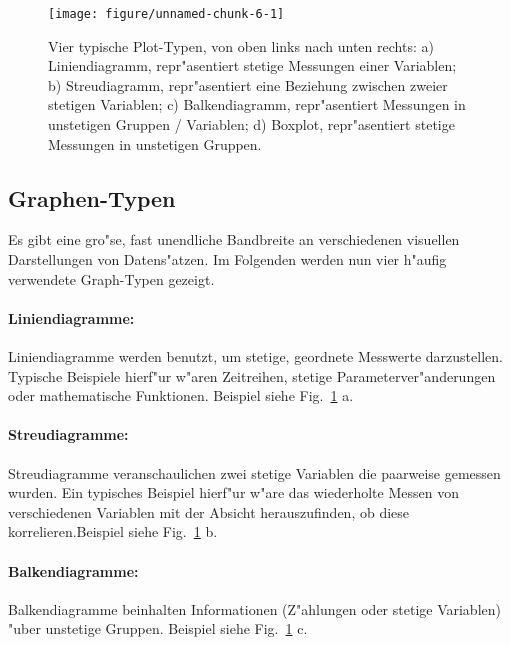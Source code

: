 \documentclass[a4paper,twoside]{tufte-book}\usepackage[]{graphicx}\usepackage[]{color}
\makeatletter
\def\maxwidth{ %
  \ifdim\Gin@nat@width>\linewidth
    \linewidth
  \else
    \Gin@nat@width
  \fi
}
\makeatother
\begin{document}
\begin{figure}[htbp]
\begin{center}

\begin{Schunk}

\texttt{[image: figure/unnamed-chunk-6-1]} \end{Schunk}
\caption{Vier typische Plot-Typen, von oben links nach unten rechts: a) Liniendiagramm, repr"asentiert stetige Messungen einer Variablen; b) Streudiagramm, repr"asentiert eine Beziehung zwischen zweier stetigen Variablen; c) Balkendiagramm, repr"asentiert Messungen in unstetigen Gruppen / Variablen; d) Boxplot, repr"asentiert stetige Messungen in unstetigen Gruppen.}
\label{fig: exaple plots}
\end{center}
\end{figure}


\subsection{Graphen-Typen}

Es gibt eine gro"se, fast unendliche Bandbreite an verschiedenen visuellen Darstellungen von Datens"atzen. Im Folgenden werden nun vier h"aufig verwendete Graph-Typen gezeigt. 

\paragraph{Liniendiagramme:} Liniendiagramme werden benutzt, um stetige, geordnete Messwerte darzustellen. Typische Beispiele hierf"ur w"aren Zeitreihen, stetige Parameterver"anderungen oder mathematische Funktionen. Beispiel siehe Fig.~\ref{fig: exaple plots} a.

\paragraph{Streudiagramme:} Streudiagramme veranschaulichen zwei stetige Variablen die paarweise gemessen wurden. Ein typisches Beispiel hierf"ur w"are das wiederholte Messen von verschiedenen Variablen mit der Absicht herauszufinden, ob diese korrelieren.Beispiel siehe Fig.~\ref{fig: exaple plots} b.

\paragraph{Balkendiagramme:} Balkendiagramme beinhalten Informationen (Z"ahlungen oder stetige Variablen) "uber unstetige Gruppen. Beispiel siehe Fig.~\ref{fig: exaple plots} c.
\end{document}
